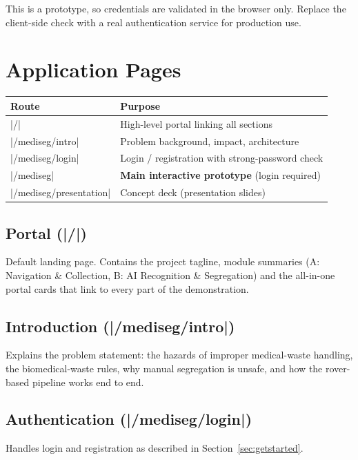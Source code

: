 \documentclass[11pt, a4paper]{article}
\begin{document}
\begin{warnbox}
This is a prototype, so credentials are validated in the browser only.
Replace the client-side check with a real authentication service for
production use.
\end{warnbox}

\section{Application Pages}

\begin{tabularx}{\textwidth}{lX}
  \toprule
  \textbf{Route} & \textbf{Purpose}\\
  \midrule
  |/| & High-level portal linking all sections\\
  |/mediseg/intro| & Problem background, impact, architecture\\
  |/mediseg/login| & Login / registration with strong-password check\\
  |/mediseg| & \textbf{Main interactive prototype} (login required)\\
  |/mediseg/presentation| & Concept deck (presentation slides)\\
  \bottomrule
\end{tabularx}

\subsection{Portal (|/|)}
Default landing page. Contains the project tagline, module summaries
(A: Navigation \& Collection, B: AI Recognition \& Segregation) and the
all-in-one portal cards that link to every part of the demonstration.

\subsection{Introduction (|/mediseg/intro|)}
Explains the problem statement: the hazards of improper medical-waste handling,
the biomedical-waste rules, why manual segregation is unsafe, and how the
rover-based pipeline works end to end.

\subsection{Authentication (|/mediseg/login|)}
Handles login and registration as described in
Section~\ref{sec:getstarted}.
\end{document}
